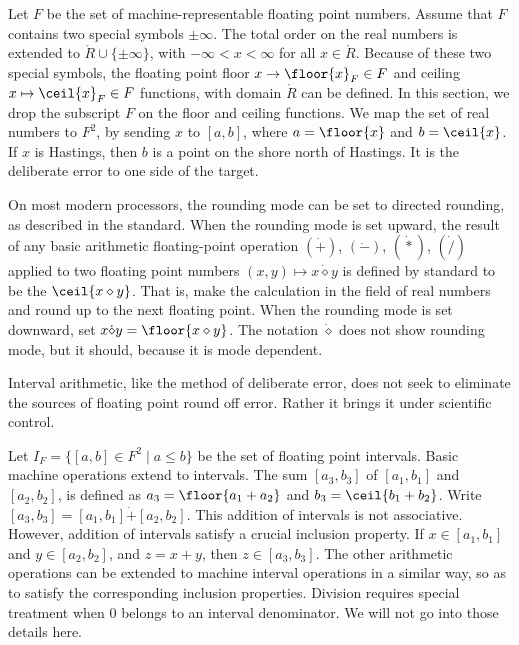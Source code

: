 Let $F$ be the set of machine-representable floating point numbers.
Assume that $F$ contains two special symbols $\pm\infty$.  The total
order on the real numbers is extended to $\ring{R}\cup\{\pm\infty\}$,
with $-\infty < x < \infty$ for all $x\in\ring{R}$.  Because of these
two special symbols, the floating point floor $x\to\floor{x}_F\in F$
and ceiling $x\mapsto\ceil{x}_F\in F$ functions, with domain
$\ring{R}$ can be defined.  In this section, we drop the subscript $F$
on the floor and ceiling functions.  We map the set of real numbers to
$F^2$, by sending $x$ to $[a,b]$, where $a = \floor{x}$ and
$b=\ceil{x}$.  If $x$ is Hastings, then $b$ is a point on the shore
north of Hastings.  It is the deliberate error to one side of the
target.





On most modern processors, the rounding mode can be set to directed
rounding, as described in the standard.  When the rounding mode is set
upward, the result of any basic arithmetic floating-point operation
$(\dot +)$, $(\dot -)$, $(\dot *)$, $(\dot /)$ applied to two floating
point numbers $(x,y)\mapsto x\dot\diamond y$ is defined by standard to
be the $\ceil{x\diamond y}$.  That is, make the calculation in the
field of real numbers and round up to the next floating point.  When
the rounding mode is set downward, set $x\dot\diamond y =
\floor{x\diamond y}$.  The notation $\dot\diamond$ does not show
rounding mode, but it should, because it is mode dependent.


Interval arithmetic, like the method of deliberate error, does not
seek to eliminate the sources of floating point round off error.
Rather it brings it under scientific control.


Let $I_F = \{[a,b] \in F^2 \mid a \le b\}$ be the set of floating
point intervals.  Basic machine operations extend to intervals.  The
sum $[a_3,b_3]$ of $[a_1,b_1]$ and $[a_2,b_2]$, is defined as
$a_3=\floor{a_1+a_2}$ and $b_3 = \ceil{b_1+b_2}$.  Write $[a_3,b_3] =
[a_1,b_1] \dot+ [a_2,b_2]$.  This addition of intervals is not
associative.  However, addition of intervals satisfy a crucial
inclusion property.  If $x\in[a_1,b_1]$ and $y\in [a_2,b_2]$, and $z =
x+y$, then $z\in [a_3,b_3]$.  The other arithmetic operations can be
extended to machine interval operations in a similar way, so as to
satisfy the corresponding inclusion properties.  Division requires
special treatment when $0$ belongs to an interval denominator.  We
will not go into those details here.

